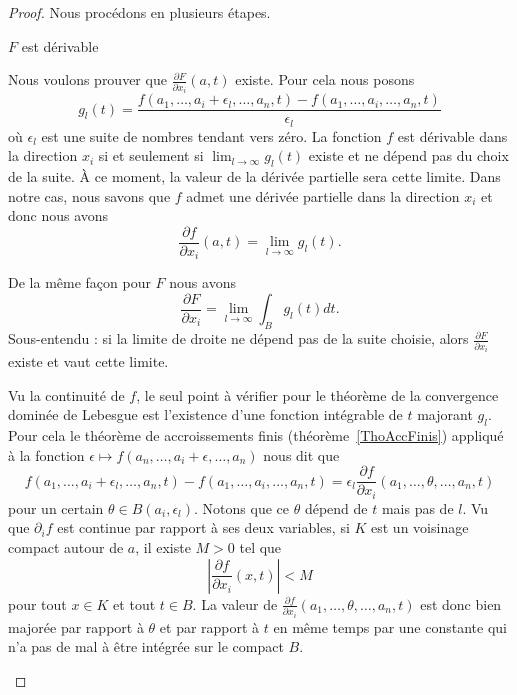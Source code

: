 \begin{proof}
    Nous procédons en plusieurs étapes.
    \begin{subproof}
    \item[\( F\) est dérivable]

        Nous voulons prouver que \( \frac{ \partial F }{ \partial x_i }(a,t)\) existe. Pour cela nous posons
        \begin{equation}
            g_l(t)=\frac{ f(a_1,\ldots, a_i+\epsilon_l,\ldots, a_n,t)-f(a_1,\ldots, a_i,\ldots, a_n,t) }{ \epsilon_l }
        \end{equation}
        où \( \epsilon_l\) est une suite de nombres tendant vers zéro. La fonction \( f\) est dérivable dans la direction \( x_i\) si et seulement si \( \lim_{l\to \infty}g_l(t) \) existe et ne dépend pas du choix de la suite. À ce moment, la valeur de la dérivée partielle sera cette limite. Dans notre cas, nous savons que \( f\) admet une dérivée partielle dans la direction \( x_i\) et donc nous avons
        \begin{equation}
            \frac{ \partial f }{ \partial x_i }(a,t)=\lim_{l\to \infty} g_l(t).
        \end{equation}

        De la même façon pour \( F\) nous avons
        \begin{equation}
            \frac{ \partial F }{ \partial x_i }=\lim_{l\to \infty} \int_{B}g_l(t)dt.
        \end{equation}
        Sous-entendu : si la limite de droite ne dépend pas de la suite choisie, alors \( \frac{ \partial F }{ \partial x_i }\) existe et vaut cette limite.

        Vu la continuité de \( f\), le seul point à vérifier pour le théorème de la convergence dominée de Lebesgue est l'existence d'une fonction intégrable de \( t\) majorant \( g_l\). Pour cela le théorème de accroissements finis (théorème~\ref{ThoAccFinis}) appliqué à la fonction \( \epsilon\mapsto f(a_n,\ldots, a_i+\epsilon,\ldots, a_n)\) nous dit que
        \begin{equation}
            f(a_1,\ldots, a_i+\epsilon_l,\ldots, a_n,t)-f(a_1,\ldots, a_i,\ldots, a_n,t)=\epsilon_l\frac{ \partial f }{ \partial x_i }(a_1,\ldots, \theta,\ldots, a_n,t)
        \end{equation}
        pour un certain \( \theta\in B(a_i,\epsilon_l)\). Notons que ce \( \theta\) dépend de \( t\) mais pas de \( l\). Vu que \( \partial_if\) est continue par rapport à ses deux variables, si \( K\) est un voisinage compact autour de \( a\), il existe \( M>0\) tel que
        \begin{equation}    \label{EqMXqviPC}
            \left| \frac{ \partial f }{ \partial x_i }(x,t) \right| < M
        \end{equation}
        pour tout \( x\in K\) et tout \( t\in B\). La valeur de \( \frac{ \partial f }{ \partial x_i }(a_1,\ldots, \theta,\ldots, a_n,t)\) est donc bien majorée par rapport à \( \theta\) et par rapport à \( t\) en même temps par une constante qui n'a pas de mal à être intégrée sur le compact \( B\).


\end{subproof}
\end{proof}
